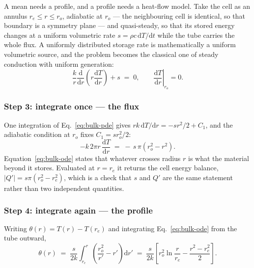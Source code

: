 A mean needs a profile, and a profile needs a heat-flow model. Take the cell as
an annulus $r_{e}\le r\le r_{o}$, adiabatic at $r_{o}$ --- the neighbouring cell
is identical, so that boundary is a symmetry plane --- and quasi-steady, so that
its stored energy changes at a uniform volumetric rate
$s=\rho c\,\mathrm{d}T/\mathrm{d}t$ while the tube carries the whole flux. A
uniformly distributed storage rate is mathematically a uniform volumetric
source, and the problem becomes the classical one of steady conduction with
uniform generation:
\begin{equation}
  \frac{k}{r}\frac{\mathrm{d}}{\mathrm{d}r}
    \left(r\frac{\mathrm{d}T}{\mathrm{d}r}\right) + s \;=\; 0,
  \qquad
  \left.\frac{\mathrm{d}T}{\mathrm{d}r}\right|_{r_{o}} = 0 .
  \label{eq:bulk-pde}
\end{equation}

\subsubsection*{Step 3: integrate once --- the flux}

One integration of Eq.~\eqref{eq:bulk-pde} gives
$rk\,\mathrm{d}T/\mathrm{d}r=-sr^{2}/2+C_{1}$, and the adiabatic condition at
$r_{o}$ fixes $C_{1}=sr_{o}^{2}/2$:
\begin{equation}
  -k\,2\pi r\,\frac{\mathrm{d}T}{\mathrm{d}r}
  \;=\; -\,s\,\pi\left(r_{o}^{2}-r^{2}\right).
  \label{eq:bulk-ode}
\end{equation}
Equation~\eqref{eq:bulk-ode} states that whatever crosses radius $r$ is what the
material beyond it stores. Evaluated at $r=r_{e}$ it returns the cell energy
balance, $\left|Q'\right|=s\pi(r_{o}^{2}-r_{e}^{2})$, which is a check that $s$
and $Q'$ are the same statement rather than two independent quantities.

\subsubsection*{Step 4: integrate again --- the profile}

Writing $\theta(r)=T(r)-T(r_{e})$ and integrating Eq.~\eqref{eq:bulk-ode} from
the tube outward,
\begin{equation}
  \theta(r) \;=\; \frac{s}{2k}\int_{r_{e}}^{r}
    \left(\frac{r_{o}^{2}}{r'}-r'\right)\mathrm{d}r'
  \;=\; \frac{s}{2k}
  \left[r_{o}^{2}\ln\frac{r}{r_{e}}-\frac{r^{2}-r_{e}^{2}}{2}\right].
  \label{eq:bulk-profile}
\end{equation}

